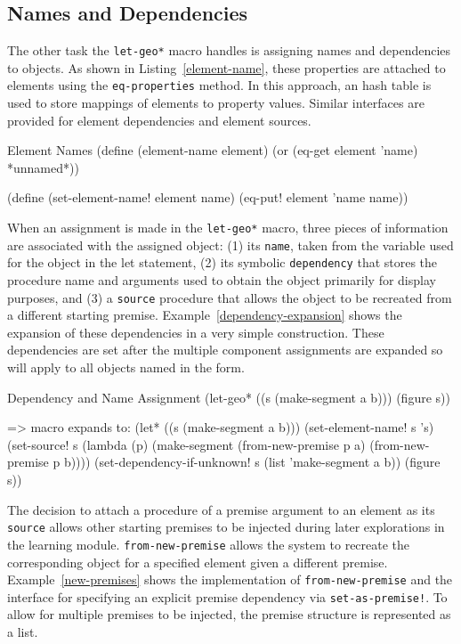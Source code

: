 \subsection{Names and Dependencies}

The other task the \texttt{let-geo*} macro handles is assigning names
and dependencies to objects. As shown in Listing~\ref{element-name},
these properties are attached to elements using the
\texttt{eq-properties} method.  In this approach, an hash table is
used to store mappings of elements to property values. Similar
interfaces are provided for element dependencies and element sources.

\begin{code-listing}
[label=element-name]
{Element Names}
(define (element-name element)
  (or (eq-get element 'name)
      *unnamed*))

(define (set-element-name! element name)
  (eq-put! element 'name name))
\end{code-listing}

When an assignment is made in the \texttt{let-geo*} macro, three
pieces of information are associated with the assigned object: (1) its
\texttt{name}, taken from the variable used for the object in the let
statement, (2) its symbolic \texttt{dependency} that stores the procedure name
and arguments used to obtain the object primarily for display
purposes, and (3) a \texttt{source} procedure that allows the object to be
recreated from a different starting
premise. Example~\ref{dependency-expansion} shows the expansion of
these dependencies in a very simple construction. These dependencies
are set after the multiple component assignments are expanded so
will apply to all objects named in the form.

\begin{repl-example}
[label=dependency-expansion]
{Dependency and Name Assignment}
(let-geo*
    ((s (make-segment a b)))
  (figure s))

=> macro expands to:
(let* ((s (make-segment a b)))
  (set-element-name! s 's)
  (set-source! s
   (lambda (p)
     (make-segment (from-new-premise p a) (from-new-premise p b))))
  (set-dependency-if-unknown! s (list 'make-segment a b))
  (figure s))
\end{repl-example}

The decision to attach a procedure of a premise argument to an element
as its \texttt{source} allows other starting premises to be injected
during later explorations in the learning
module. \texttt{from-new-premise} allows the system to recreate the
corresponding object for a specified element given a different
premise. Example~\ref{new-premises} shows the implementation of
\texttt{from-new-premise} and the interface for specifying an explicit
premise dependency via \texttt{set-as-premise!}.  To allow for
multiple premises to be injected, the premise structure is represented
as a list.

